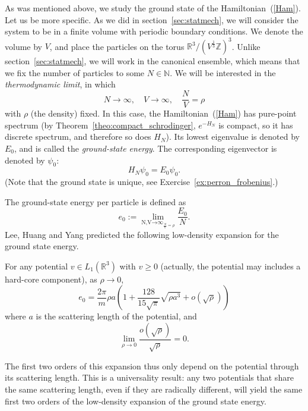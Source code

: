 \documentclass{ian}
\begin{document}
\indent
As was mentioned above, we study the ground state of the Hamiltonian\-~(\ref{Ham}).
Let us be more specific.
As we did in section\-~\ref{sec:statmech}, we will consider the system to be in a finite volume with periodic boundary conditions.
We denote the volume by $V$, and place the particles on the torus $\mathbb R^3/(V^{\frac13}\mathbb Z)^3$.
Unlike section\-~\ref{sec:statmech}, we will work in the canonical ensemble, which means that we fix the number of particles to some $N\in\mathbb N$.
We will be interested in the {\it thermodynamic limit}, in which
\begin{equation}
  N\to\infty
  ,\quad
  V\to\infty
  ,\quad
  \frac NV=\rho
\end{equation}
with $\rho$ (the density) fixed.
In this case, the Hamiltonian\-~(\ref{Ham}) has pure-point spectrum (by Theorem\-~\ref{theo:compact_schrodinger}, $e^{-H_N}$ is compact, so it has discrete spectrum, and therefore so does $H_N$).
Its lowest eigenvalue is denoted by $E_0$, and is called the {\it ground-state energy}.
The corresponding eigenvector is denoted by $\psi_0$:
\begin{equation}
  H_N\psi_0=E_0\psi_0
  .
  \label{eigenvalue}
\end{equation}
(Note that the ground state is unique, see Exercise\-~\ref{ex:perron_frobenius}.)
\bigskip

\indent
The ground-state energy per particle is defined as
\begin{equation}
  e_0:=\lim_{\displaystyle\mathop{\scriptstyle N,V\to\infty}_{\frac NV=\rho}}\frac{E_0}N
  .
\end{equation}
Lee, Huang and Yang predicted the following low-density expansion for the ground state energy.
\bigskip

\label{conjecture:lhy_e}
  For any potential $v\in L_1(\mathbb R^3)$ with $v\geqslant 0$ (actually, the potential may includes a hard-core component), as $\rho\to 0$,
  \begin{equation}
    e_0=\frac{2\pi}m\rho a\left(1+\frac{128}{15\sqrt\pi}\sqrt{\rho a^3}+o(\sqrt{\rho})\right)
    \label{lhy_e}
  \end{equation}
  where $a$ is the scattering length of the potential, and
  \nopagebreakaftereq
  \begin{equation}
    \lim_{\rho\to 0}\frac{o(\sqrt{\rho})}{\sqrt{\rho}}=0
    .
  \end{equation}
\endtheo
\restorepagebreakaftereq
\bigskip

The first two orders of this expansion thus only depend on the potential through its scattering length.
This is a universality result: any two potentials that share the same scattering length, even if they are radically different, will yield the same first two orders of the low-density expansion of the ground state energy.
\bigskip
\end{document}
